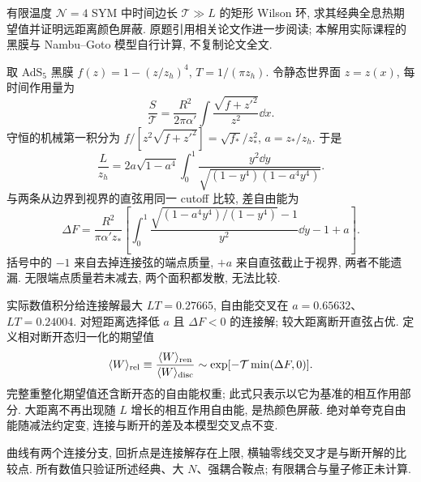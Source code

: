 \begin{exercise}
有限温度 $\mathcal N=4$ SYM 中时间边长 $\mathcal T\gg L$ 的矩形 Wilson 环, 求其经典全息热期望值并证明远距离颜色屏蔽. 原题引用相关论文作进一步阅读; 本解用实际课程的黑膜与 Nambu--Goto 模型自行计算, 不复制论文全文.
\end{exercise}
\begin{solution}
取 AdS$_5$ 黑膜 $f(z)=1-(z/z_h)^4$, $T=1/(\pi z_h)$. 令静态世界面 $z=z(x)$, 每时间作用量为\[\frac S{\mathcal T}=\frac{R^2}{2\pi\alpha'}\int\frac{\sqrt{f+z'^2}}{z^2}\dd x.\] 守恒的机械第一积分为 $f/[z^2\sqrt{f+z'^2}]=\sqrt{f_*}/z_*^2$, $a=z_*/z_h$. 于是
\[
\frac L{z_h}=2a\sqrt{1-a^4}\int_0^1
\frac{y^2\dd y}{\sqrt{(1-y^4)(1-a^4y^4)}}.
\]
与两条从边界到视界的直弦用同一 cutoff 比较, 差自由能为
\[
\Delta F=\frac{R^2}{\pi\alpha'z_*}
\left[\int_0^1\frac{\sqrt{(1-a^4y^4)/(1-y^4)}-1}{y^2}\dd y-1+a\right].
\]
括号中的 $-1$ 来自去掉连接弦的端点质量, $+a$ 来自直弦截止于视界, 两者不能遗漏. 无限端点质量若未减去, 两个面积都发散, 无法比较.

实际数值积分给连接解最大 $LT=0.27665$, 自由能交叉在 $a=0.65632$、$LT=0.24004$. 对短距离选择低 $a$ 且 $\Delta F<0$ 的连接解; 较大距离断开直弦占优. 定义相对断开态归一化的期望值
\[
\langle W\rangle_{\rm rel}\equiv
\frac{\langle W\rangle_{\rm ren}}{\langle W\rangle_{\rm disc}}
\sim\exp[-\mathcal T\min(\Delta F,0)].
\]
完整重整化期望值还含断开态的自由能权重; 此式只表示以它为基准的相互作用部分. 大距离不再出现随 $L$ 增长的相互作用自由能, 是热颜色屏蔽. 绝对单夸克自由能随减法约定变, 连接与断开的差及本模型交叉点不变.

\begin{center}\end{center}
曲线有两个连接分支, 回折点是连接解存在上限, 横轴零线交叉才是与断开解的比较点. 所有数值只验证所述经典、大 $N$、强耦合鞍点; 有限耦合与量子修正未计算.
\end{solution}
